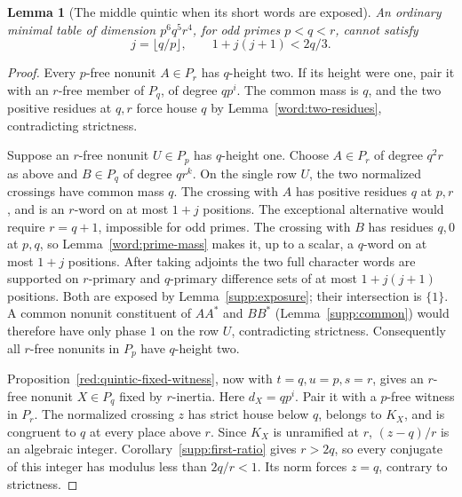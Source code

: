 \documentclass[11pt,a4paper]{article}
\numberwithin{equation}{section}
\newtheorem{lemma}[theorem]{Lemma}
\begin{document}
\begin{lemma}[The middle quintic when its short words are exposed]
\label{red:middle-small}
An ordinary minimal table of dimension \(p^6q^5r^4\), for
odd primes \(p<q<r\), cannot satisfy
\[
 j=\lfloor q/p\rfloor,\qquad 1+j(j+1)<2q/3.
\]
\end{lemma}
\begin{proof}
Every \(p\)-free nonunit \(A\in P_r\) has \(q\)-height two.
If its height were one, pair it with an \(r\)-free member
of \(P_q\), of degree \(qp^i\).  The common mass is \(q\), and the two
positive residues at \(q,r\) force house \(q\) by
Lemma~\ref{word:two-residues}, contradicting strictness.

Suppose an \(r\)-free nonunit \(U\in P_p\) has \(q\)-height one.
Choose \(A\in P_r\) of degree \(q^2r\) as above and
\(B\in P_q\) of degree \(qr^k\).  On the single row \(U\),
the two normalized crossings have common mass \(q\).
The crossing with \(A\) has positive residues \(q\) at \(p,r\),
and is an \(r\)-word on at most \(1+j\) positions.
The exceptional alternative would require \(r=q+1\), impossible
for odd primes.  The crossing with \(B\) has residues \(q,0\)
at \(p,q\), so Lemma~\ref{word:prime-mass} makes it,
up to a scalar, a \(q\)-word on at most \(1+j\) positions.
After taking adjoints the two full character words are supported
on \(r\)-primary and \(q\)-primary difference sets of at most
\(1+j(j+1)\) positions.  Both are exposed by
Lemma~\ref{supp:exposure}; their intersection is \(\{1\}\).
A common nonunit constituent of \(AA^*\) and \(BB^*\)
(Lemma~\ref{supp:common}) would therefore have only phase \(1\)
on the row \(U\), contradicting strictness.
Consequently all \(r\)-free nonunits in \(P_p\) have \(q\)-height
two.

Proposition~\ref{red:quintic-fixed-witness}, now with \(t=q,u=p,s=r\),
gives an \(r\)-free nonunit \(X\in P_q\) fixed by \(r\)-inertia.
Here $d_X=qp^i$. Pair it with a $p$-free witness in $P_r$.
The normalized crossing $z$ has strict house below $q$, belongs to
$K_X$, and is congruent to $q$ at every place above $r$.
Since $K_X$ is unramified at $r$, $(z-q)/r$ is an algebraic integer.
Corollary~\ref{supp:first-ratio} gives $r>2q$, so every conjugate
of this integer has modulus less than $2q/r<1$. Its norm forces
$z=q$, contrary to strictness.
\end{proof}
\end{document}
